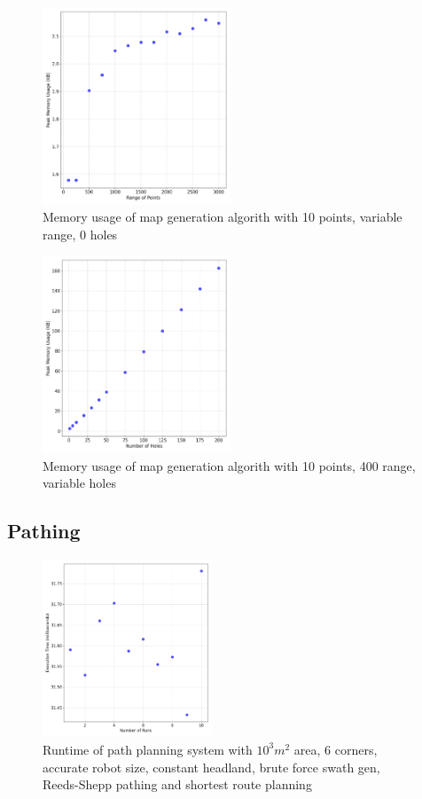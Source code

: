 \documentclass[final]{cmpreport_02}
\begin{document}
\begin{figure}[h!]
	\centering
	\includegraphics[width=0.5\textwidth]{./images/mapGenRangeMem.png}
	\caption{Memory usage of map generation algorith with 10 points, variable range, 0 holes}
	\label{PE:mg:memRange}
\end{figure}

\begin{figure}[h!]
	\centering
	\includegraphics[width=0.5\textwidth]{./images/mapGenHolesMem.png}
	\caption{Memory usage of map generation algorith with 10 points, 400 range, variable holes}
	\label{PE:mg:memHoles}
\end{figure}


\clearpage
\subsection{Pathing}
\begin{figure}[h!]
	\centering
	\includegraphics[width=0.45\textwidth]{./images/pathingBaseLineRT.png}
	\caption{Runtime of path planning system with $10^3m^2$ area, 6 corners, accurate robot size, constant headland, brute force swath gen, Reeds-Shepp pathing and shortest route planning}
	\label{PE:p:BaselineRT}
\end{figure}
\end{document}

